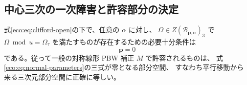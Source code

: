 \subsection{中心三次の一次障害と許容部分の決定}

\begin{theorem}[二捩れ因子の指定中心三次は平行移動方向だけに持ち上がる]
\label{eco:thm:clifford-obstruction}
式\eqref{eco:eq:clifford-open}の下で、任意の $\alpha$ に対し、
$\Omega\in Z(\mathcal B_{\mathbf p,\alpha})_3$ で
$\Omega\bmod u=\Omega_\tau$ を満たすものが存在するための必要十分条件は
\[
                         \mathbf p=0
\]
である。従って一般の対称線形 PBW 補正 $M$ で許容されるものは、
式\eqref{eco:eq:normal-parameters}の三式が零となる部分空間、
すなわち平行移動から来る三次元部分空間に正確に等しい。
\end{theorem}

